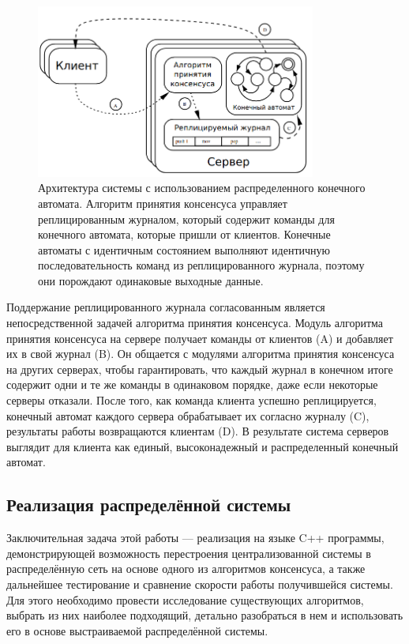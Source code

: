\documentclass[subf, href, colorlinks=true, 14pt,
times, mtpro, specialist]{disser}
\theoremstyle{definition}
\begin{document}
\vspace{-0cm}
\begin{figure}[H]
\centering
\includegraphics[width=0.82\textwidth]{src/pics/state_machine.png}
\caption{Архитектура системы с использованием распределенного конечного автомата. Алгоритм принятия консенсуса управляет реплицированным журналом, который содержит команды для конечного автомата, которые пришли от клиентов. Конечные автоматы с идентичным состоянием выполняют идентичную последовательность команд из реплицированного журнала, поэтому они порождают одинаковые выходные данные.}
\label{fig:state_machine}
\end{figure}

Поддержание реплицированного журнала согласованным является непосредственной задачей алгоритма принятия консенсуса. Модуль алгоритма принятия консенсуса на сервере получает команды от клиентов
(A) и добавляет их в свой журнал (B). Он общается с модулями алгоритма принятия консенсуса на других серверах, чтобы гарантировать, что каждый журнал в конечном итоге содержит одни и те же команды в
одинаковом порядке, даже если некоторые серверы отказали. После того, как команда клиента успешно реплицируется, конечный автомат каждого сервера обрабатывает их согласно журналу (C), результаты работы возвращаются клиентам (D). В результате система серверов выглядит для клиента как единый, высоконадежный и распределенный конечный автомат.

\subsection{Реализация распределённой системы}

Заключительная задача этой работы --- реализация на языке C++ программы, демонстрирующей возможность перестроения централизованной системы в распределённую сеть на основе одного из алгоритмов консенсуса, а также дальнейшее тестирование и сравнение скорости работы получившейся системы. Для этого необходимо провести исследование существующих алгоритмов, выбрать из них наиболее подходящий, детально разобраться в нем и использовать его в основе выстраиваемой распределённой системы.
\end{document}
